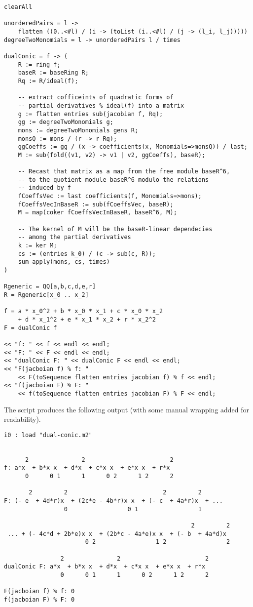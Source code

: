 \documentclass{article}
\theoremstyle{definition}
\begin{document}
\begin{lstlisting}[language = Macaulay2]
clearAll

unorderedPairs = l -> 
	flatten ((0..<#l) / (i -> (toList (i..<#l) / (j -> (l_i, l_j)))))
degreeTwoMonomials = l -> unorderedPairs l / times

dualConic = f -> (
	R := ring f;
	baseR := baseRing R;
	Rq := R/ideal(f);

	-- extract cofficeints of quadratic forms of 
	-- partial derivatives % ideal(f) into a matrix
	g := flatten entries sub(jacobian f, Rq);
	gg := degreeTwoMonomials g;
	mons := degreeTwoMonomials gens R;
	monsQ := mons / (r -> r_Rq);
	ggCoeffs := gg / (x -> coefficients(x, Monomials=>monsQ)) / last;
	M := sub(fold((v1, v2) -> v1 | v2, ggCoeffs), baseR);

	-- Recast that matrix as a map from the free module baseR^6,
	-- to the quotient module baseR^6 modulo the relations 
	-- induced by f
	fCoeffsVec := last coefficients(f, Monomials=>mons);
	fCoeffsVecInBaseR := sub(fCoeffsVec, baseR);
	M = map(coker fCoeffsVecInBaseR, baseR^6, M);

	-- The kernel of M will be the baseR-linear dependecies 
	-- among the partial derivatives
	k := ker M;
	cs := (entries k_0) / (c -> sub(c, R));
	sum apply(mons, cs, times)
)

Rgeneric = QQ[a,b,c,d,e,r]
R = Rgeneric[x_0 .. x_2]

f = a * x_0^2 + b * x_0 * x_1 + c * x_0 * x_2 
	+ d * x_1^2 + e * x_1 * x_2 + r * x_2^2
F = dualConic f

<< "f: " << f << endl << endl;
<< "F: " << F << endl << endl;
<< "dualConic F: " << dualConic F << endl << endl;
<< "F(jacboian f) % f: " 
	<< F(toSequence flatten entries jacobian f) % f << endl;
<< "f(jacboian F) % F: " 
	<< f(toSequence flatten entries jacobian F) % F << endl;
\end{lstlisting}

The script produces the following output (with some manual wrapping added for
readability). \\
\begin{lstlisting}[language=Macaulay2output]
i0 : load "dual-conic.m2"


      2               2                        2
f: a*x  + b*x x  + d*x  + c*x x  + e*x x  + r*x
      0      0 1      1      0 2      1 2      2

       2         2                           2         2 
F: (- e  + 4d*r)x  + (2c*e - 4b*r)x x  + (- c  + 4a*r)x  + ...
                 0                 0 1                 1 

                                                     2         2
 ... + (- 4c*d + 2b*e)x x  + (2b*c - 4a*e)x x  + (- b  + 4a*d)x
                       0 2                 1 2                 2

                2               2                        2
dualConic F: a*x  + b*x x  + d*x  + c*x x  + e*x x  + r*x
                0      0 1      1      0 2      1 2      2

F(jacboian f) % f: 0
f(jacboian F) % F: 0
\end{lstlisting}
\end{document}
